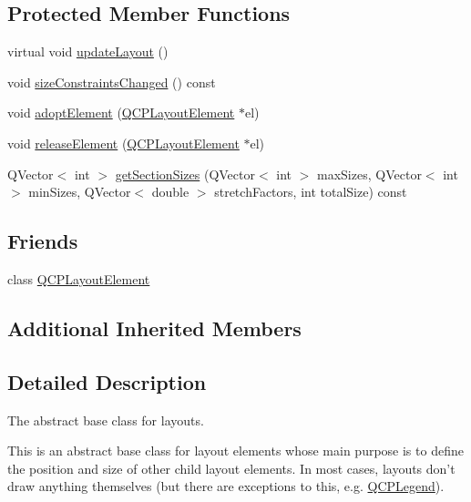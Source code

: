 \subsection*{Protected Member Functions}
\begin{DoxyCompactItemize}
\item 
virtual void \hyperlink{class_q_c_p_layout_a165c77f6287ac92e8d03017ad913378b}{update\-Layout} ()
\item 
void \hyperlink{class_q_c_p_layout_a6218cd7e5c0e30077c1aeaffe55b6145}{size\-Constraints\-Changed} () const 
\item 
void \hyperlink{class_q_c_p_layout_af6dbbc24156a808da29cd1ec031729a3}{adopt\-Element} (\hyperlink{class_q_c_p_layout_element}{Q\-C\-P\-Layout\-Element} $\ast$el)
\item 
void \hyperlink{class_q_c_p_layout_a4afbb4bef0071f72f91afdac4433a18e}{release\-Element} (\hyperlink{class_q_c_p_layout_element}{Q\-C\-P\-Layout\-Element} $\ast$el)
\item 
Q\-Vector$<$ int $>$ \hyperlink{class_q_c_p_layout_a92d9dcd95e9510b323706ef7fc4ff62e}{get\-Section\-Sizes} (Q\-Vector$<$ int $>$ max\-Sizes, Q\-Vector$<$ int $>$ min\-Sizes, Q\-Vector$<$ double $>$ stretch\-Factors, int total\-Size) const 
\end{DoxyCompactItemize}
\subsection*{Friends}
\begin{DoxyCompactItemize}
\item 
class \hyperlink{class_q_c_p_layout_a0790750c7e7f14fdbd960d172655b42b}{Q\-C\-P\-Layout\-Element}
\end{DoxyCompactItemize}
\subsection*{Additional Inherited Members}


\subsection{Detailed Description}
The abstract base class for layouts. 

This is an abstract base class for layout elements whose main purpose is to define the position and size of other child layout elements. In most cases, layouts don't draw anything themselves (but there are exceptions to this, e.\-g. \hyperlink{class_q_c_p_legend}{Q\-C\-P\-Legend}).

